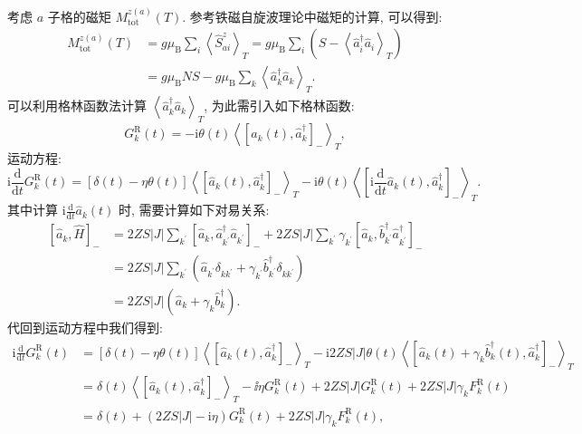 考虑 $a$ 子格的磁矩 $M_{\mathrm{tot}}^{z(a)}(T)$. 参考铁磁自旋波理论中磁矩的计算, 可以得到:
\begin{align}
M_{\mathrm{tot}}^{z(a)}(T)&=g \mu_{\mathrm{B}} \sum_{i}\left\langle\hat{S}_{a i}^{z}\right\rangle_{T}=g \mu_{\mathrm{B}} \sum_{i}\left({S}-\left\langle\hat{a}_{i}^{\dagger} \hat{a}^{}_{i}\right\rangle_{T}\right) \nonumber\\
&=g \mu_{\mathrm{B}} N S-g \mu_{\mathrm{B}} \sum_{k}\left\langle\hat{a}_{k}^{\dagger} \hat{a}^{}_{k}\right\rangle_{T}.
\end{align}
可以利用格林函数法计算 $\left\langle\hat{a}_{k}^{\dagger} \hat{a}^{}_{k}\right\rangle_{T}$, 为此需引入如下格林函数:
\begin{equation}
G_{k}^\mathrm{R}(t)=-\mathrm{i} \theta(t)\left\langle\left[\hat{a}^{}_{k}(t), \hat{a}_{k}^{\dagger}\right]_-\right\rangle_{T},
\end{equation}
运动方程:
\begin{equation}
\mathrm{i} \frac{\mathrm{d}}{\mathrm{d} t} G_{k}^\mathrm{R}(t)=[\delta(t)-\eta \theta(t)]\left\langle\left[\hat{a}^{}_{k}(t), \hat{a}_{k}^{\dagger}\right]_-\right\rangle_{T}-\mathrm{i} \theta(t)\left\langle\left[\mathrm{i} \frac{\mathrm{d}}{\mathrm{d} t} \hat{a}^{}_{k}(t), \hat{a}_{k}^{\dagger}\right]_-\right\rangle_{T}.
\end{equation}
其中计算 $\displaystyle\mathrm{i} \frac{\mathrm{d}}{\mathrm{d} t} \hat{a}_{k}(t)$ 时, 需要计算如下对易关系:
\begin{align}
{\left[\hat{a}_{k}, \hat{H}\right]_- } &=2 Z S|J| \sum_{k^{\prime}}\left[\hat{a}^{}_{k}, \hat{a}_{k^{\prime}}^{\dagger} \hat{a}^{}_{k^{\prime}}\right]_-+2 Z S|J| \sum_{k^{\prime}} \gamma^{}_{k^{\prime}}\left[\hat{a}^{}_{k}, \hat{b}_{k^{\prime}}^{\dagger} \hat{a}_{k^{\prime}}^{\dagger}\right]_- \nonumber\\
&=2 Z S|J| \sum_{k^{\prime}}\left(\hat{a}^{}_{k^{\prime}} \delta^{}_{k k^{\prime}}+\gamma^{}_{k^{\prime}} \hat{b}_{k^{\prime}}^{\dagger} \delta^{}_{k k^{\prime}}\right) \nonumber\\
&=2 Z S|J|\left(\hat{a}^{}_{k}+\gamma^{}_{k} \hat{b}_{k}^{\dagger}\right) .
\end{align}
代回到运动方程中我们得到:
\begin{align}
\mathrm{i} \frac{\mathrm{d}}{\mathrm{d} t} G_{k}^\mathrm{R}(t) &=[\delta(t)-\eta \theta(t)]\left\langle\left[\hat{a}^{}_{k}(t), \hat{a}_{k}^{\dagger}\right]_-\right\rangle_{T}-\mathrm{i} 2 Z S|J| \theta(t)\left\langle\left[\hat a^{}_{k}(t)+\gamma^{}_{k}\hat b_{k}^{\dagger}(t), \hat{a}_{k}^{\dagger}\right]_-\right\rangle_{T}\nonumber \\
&=\delta(t)\left\langle\left[\hat{a}^{}_{k}(t), \hat{a}_{k}^{\dagger}\right]_-\right\rangle_{T}-\ii\eta G_{k}^\mathrm{R}(t)+2 Z S|J| G_{k}^\mathrm{R}(t)+2 Z S|J| \gamma_{k} F_{k}^\mathrm{R}(t) \nonumber\\
&=\delta(t)+(2 Z S|J|-\mathrm{i} \eta) G_{k}^\mathrm{R}(t)+2 Z S|J| \gamma_{k} F_{k}^\mathrm{R}(t),
\end{align}
